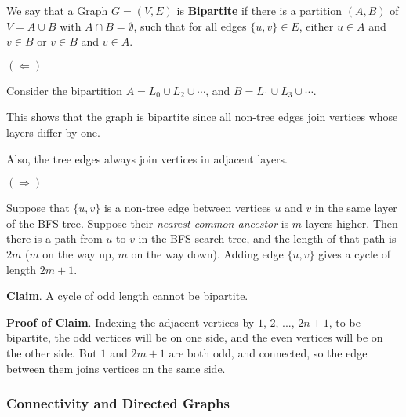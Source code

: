 \documentclass[12pt]{article}
\begin{document}
   {
    We say that a Graph $G = (V, E)$ is {\bf Bipartite} if there is a partition
    $(A, B)$ of $V = A \cup B$ with $A \cap B = \emptyset$, such that for all
    edges $\{u, v\} \in E$, either $u \in A$ and $v \in B$ or $v \in B$ and $v \in A$.

  }

  {
    $(\Leftarrow)$

    Consider the bipartition $A = L_0 \cup L_2 \cup \cdots$, and $B = L_1 \cup
    L_3 \cup \cdots$.

    This shows that the graph is bipartite since all non-tree edges join
    vertices whose layers differ by one.

    Also, the tree edges always join vertices in adjacent layers.

    $(\Rightarrow)$

    Suppose that $\{u, v\}$ is a non-tree edge between vertices $u$ and $v$ in
    the same layer of the BFS tree. Suppose their {\it nearest common ancestor}
    is $m$ layers higher. Then there is a path from $u$ to $v$ in the BFS search
    tree, and the length of that path is $2m$ ($m$ on the way up, $m$ on the way
    down). Adding edge $\{u, v\}$ gives a cycle of length $2m + 1$.

    {\bf Claim}. A cycle of odd length cannot be bipartite.

    {\bf Proof of Claim}. Indexing the adjacent vertices by $1$, $2$, ..., $2n +
    1$, to be bipartite, the odd vertices will be on one side, and the even
    vertices will be on the other side. But $1$ and $2m + 1$ are both odd, and
    connected, so the edge between them joins vertices on the same side.
  }

  \subsubsection{Connectivity and Directed Graphs}
\end{document}
